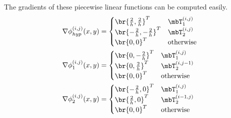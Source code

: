 \documentclass[11pt, titlepage]{article}
\begin{document}
\begin{enumerate}
\begin{enumerate}
        The gradients of these piecewise linear functions can be computed easily.
        \begin{align*}
          \nabla \phi^{(i, j)}_{hyp}(x, y) &=
          \begin{cases}
            \br{\frac{2}{h}, \frac{2}{h}}^T & \mbT^{(i, j)}_1 \\
            \br{-\frac{2}{h}, -\frac{2}{h}}^T & \mbT^{(i, j)}_2 \\
            \br{0, 0}^T & \text{otherwise}
          \end{cases} \\
          \nabla \phi^{(i, j)}_{1}(x, y) &=
          \begin{cases}
            \br{0, -\frac{2}{h}}^T & \mbT^{(i, j)}_1 \\
            \br{0, \frac{2}{h}}^T & \mbT^{(i, j-1)}_2 \\
            \br{0, 0}^T & \text{otherwise}
          \end{cases} \\
          \nabla \phi^{(i, j)}_{2}(x, y) &=
          \begin{cases}
            \br{-\frac{2}{h},0}^T & \mbT^{(i, j)}_1 \\
            \br{\frac{2}{h}, 0}^T & \mbT^{(i-1,j)}_2 \\
            \br{0, 0}^T & \text{otherwise}
          \end{cases}
        \end{align*}


\end{enumerate}
\end{enumerate}
\end{document}
